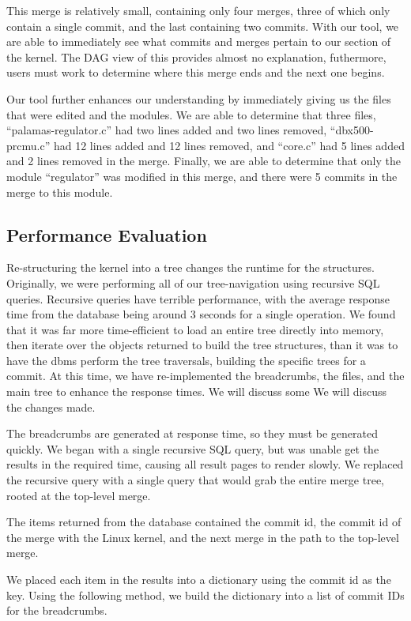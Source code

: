 \documentclass[conference, draftclsnofoot]{IEEEtran}
\begin{document}
This merge is relatively small, containing only four merges, three of which
only contain a single commit, and the last containing two commits. With our
tool, we are able to immediately see what commits and merges pertain to our
section of the kernel. The DAG view of this provides almost no explanation,
futhermore, users must work to determine where this merge ends and the next one
begins.

Our tool further enhances our understanding by immediately giving us the files
that were edited and the modules. We are able to determine that three files,
``palamas-regulator.c'' had two lines added and two lines removed,
``dbx500-prcmu.c'' had 12 lines added and 12 lines removed, and ``core.c'' had
5 lines added and 2 lines removed in the merge. Finally, we are able to
determine that only the module ``regulator'' was modified in this merge, and
there were 5 commits in the merge to this module.


\subsection{Performance Evaluation}

Re-structuring the kernel into a tree changes the runtime for the structures.
Originally, we were performing all of our tree-navigation using recursive SQL
queries. Recursive queries have terrible performance, with the average response
time from the database being around 3 seconds for a single operation. We found
that it was far more time-efficient to load an entire tree directly into
memory, then iterate over the objects returned to build the tree structures,
than it was to have the dbms perform the tree traversals, building the specific
trees for a commit. At this time, we have re-implemented the breadcrumbs, the
files, and the main tree to enhance the response times. We will discuss some We
will discuss the changes made.

The breadcrumbs are generated at response
time, so they must be generated quickly. We began with a single recursive SQL
query, but was unable get the results in the required time, causing all result
pages to render slowly. We replaced the recursive query with a single query
that would grab the entire merge tree, rooted at the top-level merge.

The items returned from the database contained the commit id, the commit id of
the merge with the Linux kernel, and the next merge in the path to the
top-level merge.

We placed each item in the results into a dictionary using the commit id as the
key. Using the following method, we build the dictionary into a list of commit
IDs for the breadcrumbs.
\end{document}
